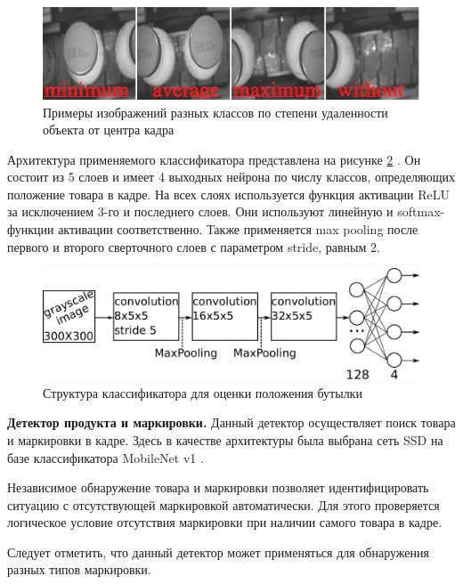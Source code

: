 \begin{figure}[ht]
	\centering
	\includegraphics[width=16cm]{man-source/images/ch4/pic4-24.jpg}
	\caption{Примеры изображений разных классов по степени удаленности объекта от центра кадра}
	\label{fig:distance_classes}
\end{figure}

Архитектура применяемого классификатора представлена на рисунке \ref{fig:nn_class1} \cite{7-A}. Он состоит из 5 слоев и имеет 4 выходных нейрона по числу классов, определяющих положение товара в кадре. На всех слоях используется функция активации ReLU за исключением 3-го и последнего слоев. Они используют линейную и softmax-функции активации соответственно. Также применяется max pooling после первого и второго сверточного слоев с параметром stride, равным 2.

\begin{figure}[ht]
	\centering
	\includegraphics[width=16cm]{man-source/images/ch4/pic4-4.pdf}
	\caption{Структура классификатора для оценки положения бутылки \cite{26-A}}
	\label{fig:nn_class1}
\end{figure}

\textbf{Детектор продукта и маркировки.} Данный детектор осуществляет поиск товара и маркировки в кадре. Здесь в качестве архитектуры была выбрана сеть SSD \cite[c.~2-4]{liu} на базе классификатора MobileNet v1 \cite[c.~4]{howard}.

Независимое обнаружение товара и маркировки позволяет идентифицировать ситуацию с отсутствующей маркировкой автоматически. Для этого проверяется логическое условие отсутствия маркировки при наличии самого товара в кадре.

Следует отметить, что данный детектор может применяться для обнаружения разных типов маркировки.

